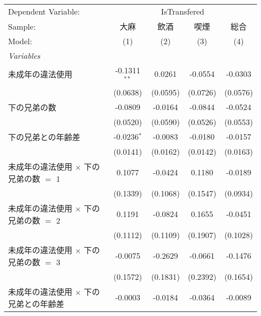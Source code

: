 \documentclass{article}
\begin{document}
\begin{landscape}


\begingroup
\centering
\begin{threeparttable}[b]
   \begin{tabular}{lcccc}
      \tabularnewline \midrule \midrule
      Dependent Variable: & \multicolumn{4}{c}{IsTransfered}\\
      Sample:                                       & 大麻           & 飲酒     & 喫煙     & 総合 \\   
      Model:                                        & (1)            & (2)      & (3)      & (4)\\  
      \midrule
      \emph{Variables}\\
      未成年の違法使用                              & -0.1311$^{**}$ & 0.0261   & -0.0554  & -0.0303\\   
                                                    & (0.0638)       & (0.0595) & (0.0726) & (0.0576)\\   
      下の兄弟の数                                  & -0.0809        & -0.0164  & -0.0844  & -0.0524\\   
                                                    & (0.0520)       & (0.0590) & (0.0526) & (0.0553)\\   
      下の兄弟との年齢差                            & -0.0236$^{*}$  & -0.0083  & -0.0180  & -0.0157\\   
                                                    & (0.0141)       & (0.0162) & (0.0142) & (0.0163)\\   
      未成年の違法使用 $\times$ 下の兄弟の数 $=$ 1  & 0.1077         & -0.0424  & 0.1180   & -0.0189\\   
                                                    & (0.1339)       & (0.1068) & (0.1547) & (0.0934)\\   
      未成年の違法使用 $\times$ 下の兄弟の数 $=$ 2  & 0.1191         & -0.0824  & 0.1655   & -0.0451\\   
                                                    & (0.1112)       & (0.1109) & (0.1907) & (0.1028)\\   
      未成年の違法使用 $\times$ 下の兄弟の数 $=$ 3  & -0.0075        & -0.2629  & -0.0661  & -0.1476\\   
                                                    & (0.1572)       & (0.1831) & (0.2392) & (0.1654)\\   
      未成年の違法使用 $\times$ 下の兄弟との年齢差  & -0.0003        & -0.0184  & -0.0364  & -0.0089\\   

\end{tabular}
\end{threeparttable}
\end{landscape}
\end{document}
